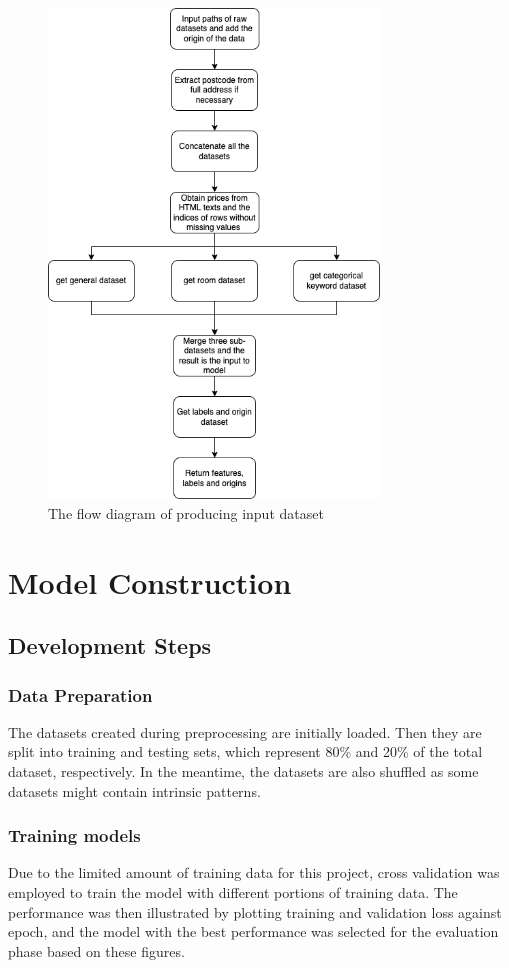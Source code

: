 \documentclass[12pt,twoside]{report}
\begin{document}
\begin{figure}[h]
	\centering
	\includegraphics[height=13cm]{create_input_dataset}
	\caption{The flow diagram of producing  input dataset}
	\label{create_input_dataset}
\end{figure}

\section{Model Construction}

\subsection{Development Steps}
\subsubsection{Data Preparation}
The datasets created during preprocessing are initially loaded. Then they are split into training and testing sets, which represent 80\% and 20\% of the total dataset, respectively. In the meantime, the datasets are also shuffled as some datasets might contain intrinsic patterns.

\subsubsection{Training models}
Due to the limited amount of training data for this project, cross validation was employed to train the model with different portions of training data. The performance was then illustrated by plotting training and validation loss against epoch, and the model with the best performance was selected for the evaluation phase based on these figures. 
\end{document}
